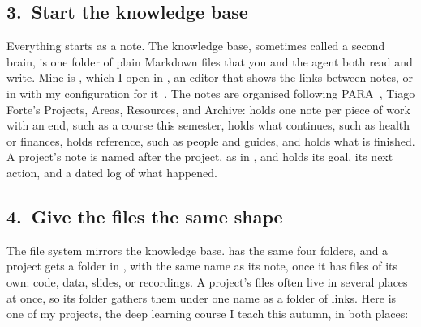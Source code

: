 \documentclass[11pt,a4paper]{article}
\newcommand{\home}{\textasciitilde}
\begin{document}
\subsection*{3.\ Start the knowledge base}

Everything starts as a note. The knowledge base, sometimes called a second brain, is one folder of plain Markdown files that you and the agent both read and write. Mine is \name{\home/md-Wiki/}, which I open in , an editor that shows the links between notes, %
or in  with my configuration for it~\cite{dots}. The notes are organised following PARA~\cite{para}, Tiago Forte's Projects, Areas, Resources, and Archive:  holds one note per piece of work with an end, such as a course this semester,  holds what continues, such as health or finances,  holds reference, such as people and guides, and  holds what is finished. A project's note is named after the project, as in , and holds its goal, its next action, and a dated log of what happened.

\subsection*{4.\ Give the files the same shape}

The file system mirrors the knowledge base. \name{\home/PARA/} has the same four folders, and a project gets a folder in \name{\home/PARA/Projects/}, with the same name as its note, once it has files of its own: code, data, slides, or recordings. A project's files often live in several places at once, so its folder gathers them under one name as a folder of links. %
Here is one of my projects, the deep learning course I teach this autumn, in both places:
\end{document}
